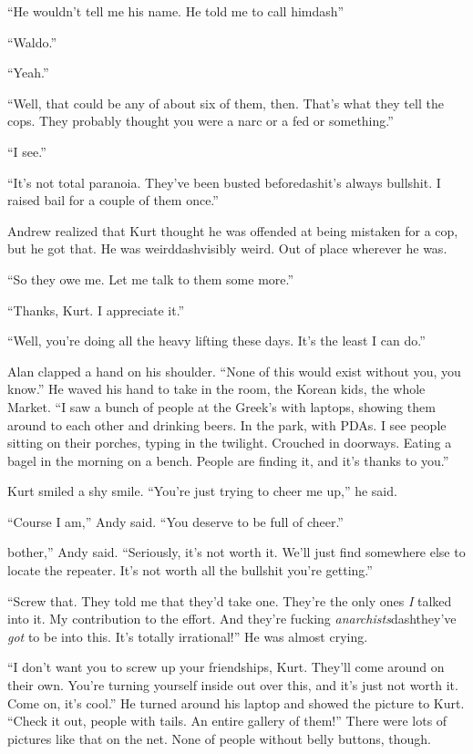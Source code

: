 ``He wouldn't tell me his name.  He told me to call himdash{}''

``Waldo.''

``Yeah.''

``Well, that could be any of about six of them, then.  That's what
they tell the cops.  They probably thought you were a narc or a fed or
something.''

``I see.''

``It's not total paranoia.  They've been busted beforedash{}it's always
bullshit.  I raised bail for a couple of them once.''

Andrew realized that Kurt thought he was offended at being mistaken
for a cop, but he got that.  He was weirddash{}visibly weird.  Out of
place wherever he was.

``So they owe me.  Let me talk to them some more.''

``Thanks, Kurt.  I appreciate it.''

``Well, you're doing all the heavy lifting these days.  It's the least
I can do.''

Alan clapped a hand on his shoulder.  ``None of this would exist
without you, you know.'' He waved his hand to take in the room, the
Korean kids, the whole Market.  ``I saw a bunch of people at the
Greek's with laptops, showing them around to each other and drinking
beers.  In the park, with PDAs.  I see people sitting on their
porches, typing in the twilight.  Crouched in doorways.  Eating a
bagel in the morning on a bench.  People are finding it, and it's
thanks to you.''

Kurt smiled a shy smile.  ``You're just trying to cheer me up,'' he
said.

``Course I am,'' Andy said.  ``You deserve to be full of cheer.''

bother,''
Andy said.  ``Seriously, it's not worth it.  We'll
just find somewhere else to locate the repeater.  It's not worth all
the bullshit you're getting.''

``Screw that.  They told me that they'd take one.  They're the only
ones \textit{I} talked into it.  My contribution to the effort.  And
they're fucking \textit{anarchists}dash{}they've \textit{got} to be into
this.  It's totally irrational!'' He was almost crying.

``I don't want you to screw up your friendships, Kurt.  They'll come
around on their own.  You're turning yourself inside out over this,
and it's just not worth it.  Come on, it's cool.'' He turned around
his laptop and showed the picture to Kurt.  ``Check it out, people
with tails.  An entire gallery of them!'' There were lots of pictures
like that on the net.  None of people without belly buttons, though.

